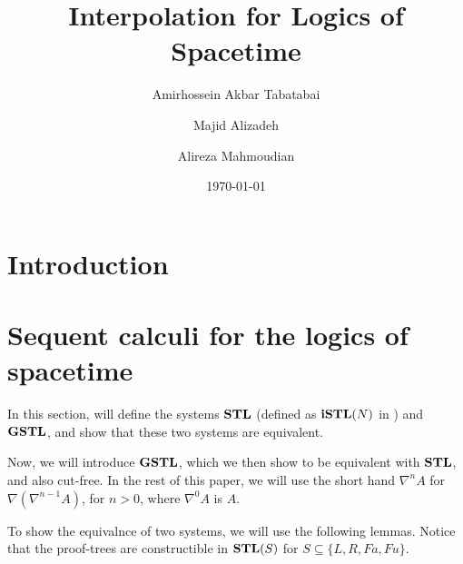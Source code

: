 \documentclass[10pt,a4paper]{amsart}
\begin{document}
   
\title{Interpolation for Logics of Spacetime}
\author{Amirhossein Akbar Tabatabai}


\author{Majid Alizadeh}

\author{Alireza Mahmoudian}

\date{\today}
 
\begin{abstract}
	
\end{abstract}

\maketitle



\section{Introduction}


\section{Sequent calculi for the logics of spacetime}
In this section, will define the systems $\mathbf{STL}$ (defined as $\mathbf{iSTL}(N)$ in \cite{amir}) and $\mathbf{GSTL}$, and show that these two systems are equivalent.



Now, we will introduce $\mathbf{GSTL}$, which we then show to be equivalent with $\mathbf{STL}$, and also cut-free. In the rest of this paper, we will use the short hand $\nabla^n A$ for $\nabla (\nabla^{n-1} A)$, for $n > 0$, where $\nabla^0 A$ is $A$.



To show the equivalnce of two systems, we will use the following lemmas. Notice that the proof-trees are constructible in $\mathbf{STL}(S)$ for $S \subseteq \{ L, R, Fa, Fu \}$.














\end{document}
